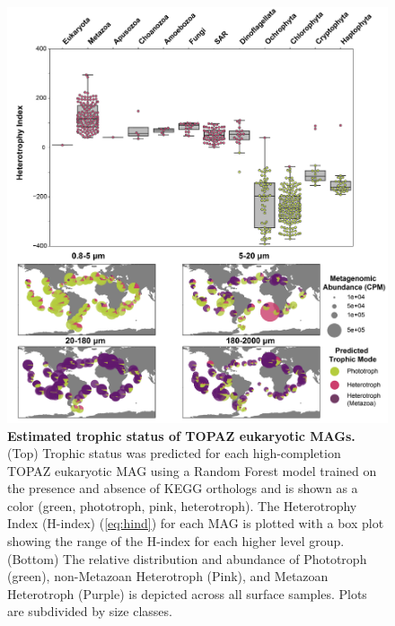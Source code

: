 \documentclass[12pt]{article}
\numberwithin{equation}{section}
\begin{document}
\begin{figure}[h!]    
    \centering
    \includegraphics[width = 0.9\columnwidth]{figures/Figure4_Trophic_Mode_v2-01.png}
    \caption{\textbf{Estimated trophic status of TOPAZ eukaryotic MAGs.} (Top) Trophic status was predicted for each high-completion TOPAZ eukaryotic MAG using a Random Forest model trained on the presence and absence of KEGG orthologs and is shown as a color (green, phototroph, pink, heterotroph). The Heterotrophy Index (H-index) (\cref{eq:hind}) for each MAG is plotted with a box plot showing the range of the H-index for each higher level group. (Bottom) The relative distribution and abundance of Phototroph (green), non-Metazoan Heterotroph (Pink), and Metazoan Heterotroph (Purple) is depicted across all surface samples. Plots are subdivided by size classes. }
    \label{fig:fig4-trophy}
\end{figure}
\end{document}
